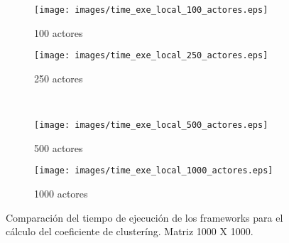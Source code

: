 \documentclass[12pt,a4paper]{article}
\author{Hermilo Cortés González}
\begin{document}

\begin{landscape}

\begin{figure}
 \center
\begin{subfigure}{.7\textwidth}
  \centering
  \texttt{[image: images/time\_exe\_local\_100\_actores.eps]}  
  \caption{100 actores}
  \label{fig:sub-first}
\end{subfigure}
\begin{subfigure}{.7\textwidth}
  \centering
  \texttt{[image: images/time\_exe\_local\_250\_actores.eps]}  
  \caption{250 actores}
  \label{fig:sub-second}
\end{subfigure}\\
\begin{subfigure}{.7\textwidth}
  \centering
  \texttt{[image: images/time\_exe\_local\_500\_actores.eps]}  
  \caption{500 actores}
  \label{fig:sub-third}
\end{subfigure}
\begin{subfigure}{.7\textwidth}
  \centering
  \texttt{[image: images/time\_exe\_local\_1000\_actores.eps]}  
  \caption{1000 actores}
  \label{fig:sub-fourth}
\end{subfigure}
\caption{Comparación del tiempo de ejecución de los frameworks para el cálculo del coeficiente de clusteríng. Matriz 1000 X 1000.}
\label{fig:tiempoejecucionlocal}
\end{figure}

\end{landscape}
\restoregeometry
\end{document}
